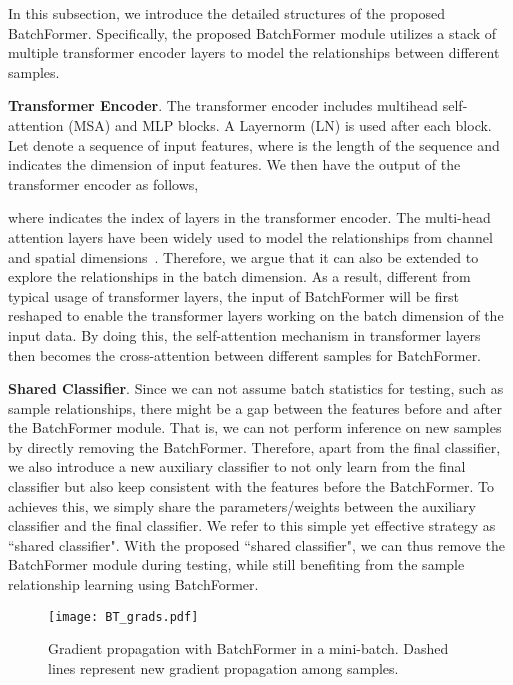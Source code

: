\documentclass[10pt,twocolumn,letterpaper]{article}
\begin{document}
In this subsection, we introduce the detailed structures of the proposed BatchFormer. Specifically, the proposed BatchFormer module utilizes a stack of multiple transformer encoder layers to model the relationships between different samples.

\textbf{Transformer Encoder}. The transformer encoder includes multihead self-attention (MSA) and MLP blocks. A Layernorm (LN) is used after each block. Let  denote a sequence of input features, where  is the length of the sequence and  indicates the dimension of input features. We then have the output of the transformer encoder as follows,

where  indicates the index of layers in the transformer encoder. The multi-head attention layers have been widely used to model the relationships from channel and spatial dimensions~\cite{vaswani2017attention, dosovitskiy2020image, Hu_2018_CVPR}. Therefore, we argue that it can also be extended to explore the relationships in the batch dimension. As a result, different from typical usage of transformer layers, the input of BatchFormer will be first reshaped to enable the transformer layers working on the batch dimension of the input data. By doing this, the self-attention mechanism in transformer layers then becomes the cross-attention between different samples for BatchFormer.




\textbf{Shared Classifier}. Since we can not assume batch statistics for testing, such as sample relationships, there might be a gap between the features before and after the BatchFormer module. That is, we can not perform inference on new samples by directly removing the BatchFormer. Therefore, apart from the final classifier, we also introduce a new auxiliary classifier to not only learn from the final classifier but also keep consistent with the features before the BatchFormer. To achieves this, we simply share the parameters/weights between the auxiliary classifier and the final classifier. We refer to this simple yet effective strategy as ``shared classifier". With the proposed ``shared classifier", we can thus remove the BatchFormer module during testing, while still benefiting from the sample relationship learning using BatchFormer.


\begin{figure}[!ht]
    \centering
    \texttt{[image: BT\_grads.pdf]}
    \caption{Gradient propagation with BatchFormer in a mini-batch. Dashed lines represent new gradient propagation among samples.}
    \label{fig:grads_illu}
\end{figure}
\end{document}

